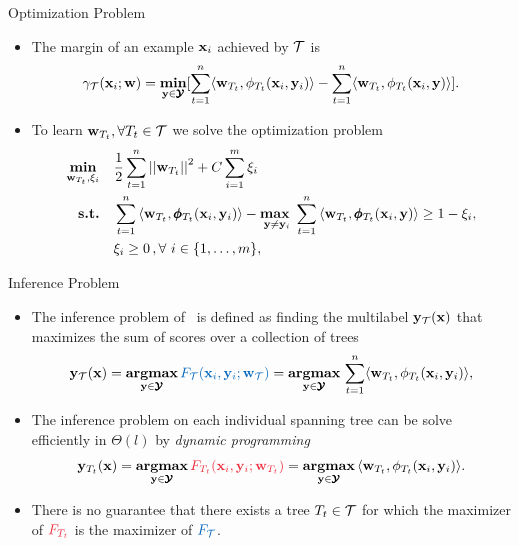 \documentclass[first=dgreen,second=purple,logo=yellowexc]{aaltoslides}
\begin{document}
%
\begin{frame}{Optimization Problem}
	\begin{itemize}
		\item The margin of an example $\mathbf {x}_i$ achieved by $\mathcal{T}$ is
		\begin{align*}
		\gamma_{\mathcal{T}}(\mathbf {x}_i;\mathbf {w}) = \underset{\mathbf {y}\in\pmb {\mathcal{Y}}}{\textbf{min}}[\sum_{t=1}^{n}\langle \mathbf {w}_{T_t}, \phi_{T_t}(\mathbf {x}_i,\mathbf {y}_i) \rangle-\sum_{t=1}^{n}\langle \mathbf {w}_{T_t}, \phi_{T_t}(\mathbf {x}_i,\mathbf {y}) \rangle].
	\end{align*}
		\item To learn $\mathbf {w}_{T_t},\forall T_t\in\mathcal{T}$ we solve the optimization problem
		\begin{align*}
			\underset{\vw_{T_t},\xi_i}{\minimize} & \quad \frac{1}{2}\sum_{t=1}^{n}\norm{\vw_{T_t}}^2 + C\sum_{i=1}^{m}\xi_i\\
			\st & \quad \sum_{t=1}^{n}{ \langle \vw_{T_t}, \phib_{T_t}(\vx_i,\vy_i) \rangle} - \underset{\vy \neq \vy_i}{\maximize\ } \sum_{t=1}^{n}{\langle \vw_{T_t}, \phib_{T_t}(\vx_i,\vy) \rangle } \geq 1 -  \xi_i, \\
			& \quad \xi_i\ge0\, , \forall\ i \in \set{1,\dots,m},
		\end{align*}
	\end{itemize}
\end{frame}



%
\begin{frame}{Inference Problem}
	\begin{itemize}
		\item The inference problem of \rta\ is defined as finding the multilabel $\mathbf {y}_{\mathcal{T}}(\mathbf {x})$ that maximizes the sum of scores over a collection of trees
		\begin{align*}
			\vy_{\Tcal}(\vx) = \underset{\vy\in\vYcal}{\argmax}\,{\color{aaltoblue}F_{\Tcal}(\vx_i,\vy_i;\vw_{\Tcal})} = \underset{\vy\in\vYcal}{\argmax}\,\sum_{t=1}^{n}\ip{\vw_{T_t}}{\phi_{T_t}(\vx_i,\vy_i)},
		\end{align*}
		\item The inference problem on each individual spanning tree can be solve efficiently in $\Theta(l)$ by \textit{dynamic programming}
		\begin{align*}
			\vy_{T_t}(\vx) = \underset{\vy\in\vYcal}{\argmax}\,{\color{aaltored}F_{T_t}(\vx_i,\vy_i;\vw_{T_t})}= \underset{\vy\in\vYcal}{\argmax}\,\ip{\vw_{T_t}}{\phi_{T_t}(\vx_i,\vy_i)}.
		\end{align*}
		\item There is no guarantee that there exists a tree $T_t\in\mathcal{T}$ for which the maximizer of ${\color{aaltored}F_{T_t}}$ is the maximizer of ${\color{aaltoblue}F_{\Tcal}}$.
	\end{itemize}
\end{frame}
\end{document}
